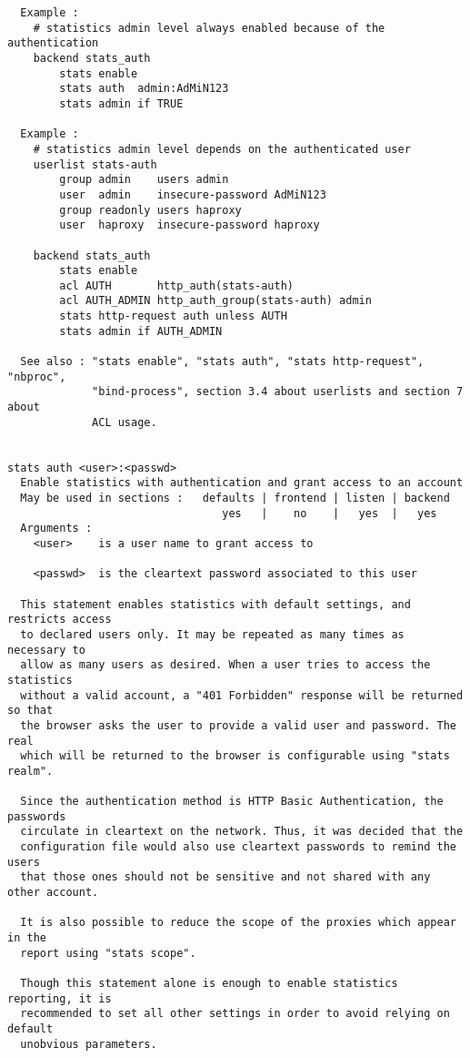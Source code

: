\begin{verbatim}
  Example :
    # statistics admin level always enabled because of the authentication
    backend stats_auth
        stats enable
        stats auth  admin:AdMiN123
        stats admin if TRUE

  Example :
    # statistics admin level depends on the authenticated user
    userlist stats-auth
        group admin    users admin
        user  admin    insecure-password AdMiN123
        group readonly users haproxy
        user  haproxy  insecure-password haproxy

    backend stats_auth
        stats enable
        acl AUTH       http_auth(stats-auth)
        acl AUTH_ADMIN http_auth_group(stats-auth) admin
        stats http-request auth unless AUTH
        stats admin if AUTH_ADMIN

  See also : "stats enable", "stats auth", "stats http-request", "nbproc",
             "bind-process", section 3.4 about userlists and section 7 about
             ACL usage.


stats auth <user>:<passwd>
  Enable statistics with authentication and grant access to an account
  May be used in sections :   defaults | frontend | listen | backend
                                 yes   |    no    |   yes  |   yes
  Arguments :
    <user>    is a user name to grant access to

    <passwd>  is the cleartext password associated to this user

  This statement enables statistics with default settings, and restricts access
  to declared users only. It may be repeated as many times as necessary to
  allow as many users as desired. When a user tries to access the statistics
  without a valid account, a "401 Forbidden" response will be returned so that
  the browser asks the user to provide a valid user and password. The real
  which will be returned to the browser is configurable using "stats realm".

  Since the authentication method is HTTP Basic Authentication, the passwords
  circulate in cleartext on the network. Thus, it was decided that the
  configuration file would also use cleartext passwords to remind the users
  that those ones should not be sensitive and not shared with any other account.

  It is also possible to reduce the scope of the proxies which appear in the
  report using "stats scope".

  Though this statement alone is enough to enable statistics reporting, it is
  recommended to set all other settings in order to avoid relying on default
  unobvious parameters.


\end{verbatim}
